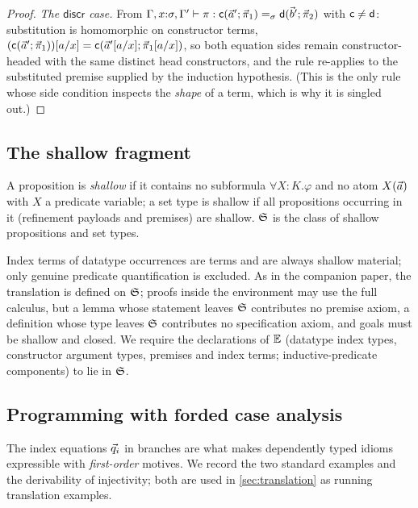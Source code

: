 \begin{proof}
\emph{The $\mathsf{discr}$ case.}  From $\Gamma, x{:}\sigma, \Gamma'
\vdash \pi : \mathsf{c}(\vec{a}';\vec{\pi}_1) =_\sigma
\mathsf{d}(\vec{b}';\vec{\pi}_2)$ with $\mathsf{c} \neq \mathsf{d}$:
substitution is homomorphic on constructor terms,
$(\mathsf{c}(\vec{a}';\vec{\pi}_1))[a/x] = \mathsf{c}(\vec{a}'[a/x];
\vec{\pi}_1[a/x])$, so both equation sides remain constructor-headed
with the same distinct head constructors, and the rule re-applies to
the substituted premise supplied by the induction hypothesis.  (This
is the only rule whose side condition inspects the \emph{shape} of a
term, which is why it is singled out.)
\end{proof}

\subsection{The shallow fragment}
\label{sec:calculus-shallow}

\begin{definition}
\label{def:shallow-fragment}
A proposition is \emph{shallow} if it contains no subformula $\forall
X{:}K.\varphi$ and no atom $X(\vec{a})$ with $X$ a predicate variable; a
set type is shallow if all propositions occurring in it (refinement
payloads and premises) are shallow.  $\mathfrak{S}$ is the class of shallow
propositions and set types.
\end{definition}

Index terms of datatype occurrences are terms and are always shallow
material; only genuine predicate quantification is excluded.  As in the
companion paper, the translation is defined on $\mathfrak{S}$; proofs inside
the environment may use the full calculus, but a lemma whose statement
leaves $\mathfrak{S}$ contributes no premise axiom, a definition whose type
leaves $\mathfrak{S}$ contributes no specification axiom, and goals must be
shallow and closed.  We require the declarations of $\mathbb{E}$ (datatype
index types, constructor argument types, premises and index terms;
inductive-predicate components) to lie in $\mathfrak{S}$.

\subsection{Programming with forded case analysis}
\label{sec:calculus-programming}

The index equations $\vec{q}_i$ in branches are what makes dependently
typed idioms expressible with \emph{first-order} motives.  We record the
two standard examples and the derivability of injectivity; both are used
in \cref{sec:translation} as running translation examples.

